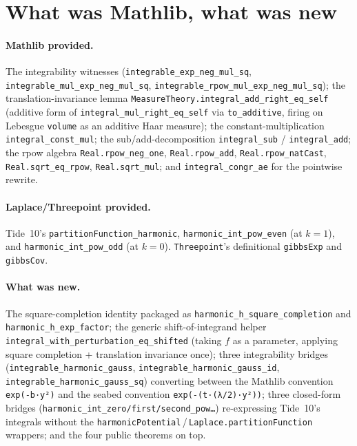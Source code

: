 \documentclass[11pt]{article}
\begin{document}
\section{What was Mathlib, what was new}

\paragraph{Mathlib provided.} The integrability witnesses
(\texttt{integrable\_exp\_neg\_mul\_sq},
\texttt{integrable\_mul\_exp\_neg\_mul\_sq},
\texttt{integrable\_rpow\_mul\_exp\_neg\_mul\_sq}); the
translation-invariance lemma
\texttt{MeasureTheory.integral\_add\_right\_eq\_self} (additive form
of \texttt{integral\_mul\_right\_eq\_self} via \texttt{to\_additive},
firing on Lebesgue \texttt{volume} as an additive Haar measure); the
constant-multiplication \texttt{integral\_const\_mul}; the
sub/add-decomposition \texttt{integral\_sub} / \texttt{integral\_add};
the rpow algebra \texttt{Real.rpow\_neg\_one}, \texttt{Real.rpow\_add},
\texttt{Real.rpow\_natCast}, \texttt{Real.sqrt\_eq\_rpow},
\texttt{Real.sqrt\_mul}; and \texttt{integral\_congr\_ae} for the
pointwise rewrite.

\paragraph{Laplace/Threepoint provided.} Tide~10's
\texttt{partitionFunction\_harmonic},
\texttt{harmonic\_int\_pow\_even} (at $k=1$), and
\texttt{harmonic\_int\_pow\_odd} (at $k=0$). \texttt{Threepoint}'s
definitional \texttt{gibbsExp} and \texttt{gibbsCov}.

\paragraph{What was new.} The square-completion identity packaged as
\texttt{harmonic\_h\_square\_completion} and
\texttt{harmonic\_h\_exp\_factor}; the generic shift-of-integrand
helper \texttt{integral\_with\_perturbation\_eq\_shifted} (taking
$f$ as a parameter, applying square completion + translation
invariance once); three integrability bridges
(\texttt{integrable\_harmonic\_gauss},
\texttt{integrable\_harmonic\_gauss\_id},
\texttt{integrable\_harmonic\_gauss\_sq}) converting between the
Mathlib convention \texttt{exp(-b·y²)} and the seabed convention
\texttt{exp(-(t·(λ/2)·y²))}; three closed-form bridges
(\texttt{harmonic\_int\_zero/first/second\_pow…}) re-expressing
Tide~10's integrals without the
\texttt{harmonicPotential}\,/\,\texttt{Laplace.partitionFunction}
wrappers; and the four public theorems on top.
\end{document}
